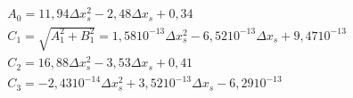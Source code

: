 \begin{eqnarray}
&A_0=11,94 \Delta x_s^2-2,48\Delta x_s+ 0,34\\
&C_1=\sqrt{A_1^2+B_1^2}=1,58 10^{-13} \Delta x_s^2-6,52 10^{-13} \Delta x_s+ 9,47 10^{-13}\\
&C_2=16,88 \Delta x_s^2-3,53  \Delta x_s+0,41\\
&C_3=-2,43 10^{-14} \Delta x_s^2+3,52 10^{-13} \Delta x_s- 6,29 10^{-13}
\end{eqnarray}






























































